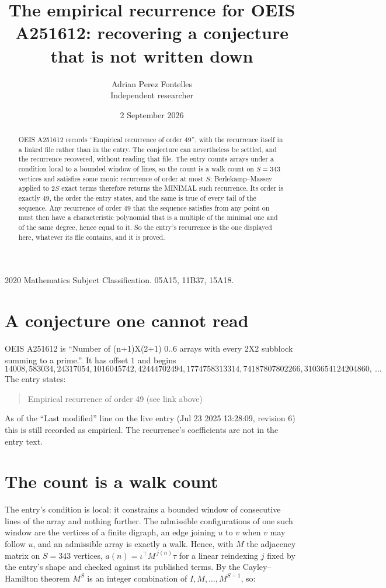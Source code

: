 \documentclass[11pt,a4paper]{article}
\title{The empirical recurrence for OEIS A251612: recovering a conjecture that is not written down}
\author{Adrian Perez Fontelles\\ \small Independent researcher}
\date{2 September 2026}
\theoremstyle{plain}
\theoremstyle{definition}
\begin{document}
\maketitle

\begin{abstract}
OEIS A251612 records ``Empirical recurrence of order $49$'', with the recurrence itself in a
linked file rather than in the entry. The conjecture can nevertheless be settled, and the
recurrence recovered, without reading that file. The entry counts arrays under a condition
local to a bounded window of lines, so the count is a walk count on $S=343$ vertices and
satisfies some monic recurrence of order at most $S$; Berlekamp--Massey applied to $2S$ exact
terms therefore returns the MINIMAL such recurrence. Its order is exactly $49$, the order
the entry states, and the same is true of every tail of the sequence. Any recurrence of order
$49$ that the sequence satisfies from any point on must then have a characteristic
polynomial that is a multiple of the minimal one and of the same degree, hence equal to it. So
the entry's recurrence is the one displayed here, whatever its file contains, and it is
proved.
\end{abstract}

\noindent\small 2020 Mathematics Subject Classification. 05A15, 11B37, 15A18.\normalsize

\section{A conjecture one cannot read}

OEIS A251612 is ``Number of (n+1)X(2+1) 0..6 arrays with every 2X2 subblock summing to a prime.''. It has offset $1$ and begins
\[
14008, 583034, 24317054, 1016045742, 42444702494, 1774758313314, 74187807802266, 3103654124204860,\ \dots
\]
The entry states:
\begin{quote}
Empirical recurrence of order 49 (see link above)
\end{quote}
As of the ``Last modified'' line on the live entry (Jul 23 2025 13:28:09, revision 6) this is still
recorded as empirical. The recurrence's coefficients are not in the entry text.

\section{The count is a walk count}

The entry's condition is local: it constrains a bounded window of consecutive lines of the
array and nothing further. The admissible configurations of one such window are the vertices
of a finite digraph, an edge joining $u$ to $v$ when $v$ may follow $u$, and an admissible
array is exactly a walk. Hence, with $M$ the adjacency matrix on $S=343$ vertices,
$a(n)=\iota^{\!\top}M^{\,j(n)}\tau$ for a linear reindexing $j$ fixed by the entry's shape
and checked against its published terms. By the Cayley--Hamilton theorem $M^{S}$ is an
integer combination of $I,M,\dots,M^{S-1}$, so:
\end{document}
